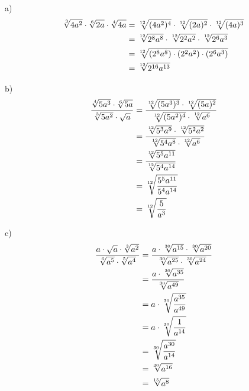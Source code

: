 \begin{solucio}
a)%
\begin{align*}
\sqrt[3]{4a^{2}}\cdot \sqrt[6]{2a}\cdot \sqrt[4]{4a} &=\sqrt[12]{%
(4a^{2})^{4}}\cdot \sqrt[12]{(2a)^{2}}\cdot \sqrt[12]{(4a)^{3}} \\
&=\sqrt[12]{2^{8}a^{8}}\cdot \sqrt[12]{2^{2}a^{2}}\cdot \sqrt[12]{2^{6}a^{3}%
} \\
&=\sqrt[12]{\left( 2^{8}a^{8}\right) \cdot \left( 2^{2}a^{2}\right) \cdot
\left( 2^{6}a^{3}\right) } \\
&=\sqrt[12]{2^{16}a^{13}}
\end{align*}

b)%
\begin{align*}
\frac{\sqrt[4]{5a^{3}}\cdot \sqrt[6]{5a}}{\sqrt[3]{5a^{2}}\cdot \sqrt{a}} &=%
\frac{\sqrt[12]{(5a^{3})^{3}}\cdot \sqrt[12]{(5a)^{2}}}{\sqrt[12]{%
(5a^{2})^{4}}\cdot \sqrt[12]{a^{6}}} \\
&=\frac{\sqrt[12]{5^{3}a^{9}}\cdot \sqrt[12]{5^{2}a^{2}}}{\sqrt[12]{%
5^{4}a^{8}}\cdot \sqrt[12]{a^{6}}} \\
&=\frac{\sqrt[12]{5^{5}a^{11}}}{\sqrt[12]{5^{4}a^{14}}} \\
&=\sqrt[12]{\frac{5^{5}a^{11}}{5^{4}a^{14}}} \\
&=\sqrt[12]{\frac{5}{a^{3}}}
\end{align*}

c)%
\begin{align*}
\frac{a\cdot \sqrt{a}\cdot \sqrt[3]{a^{2}}}{\sqrt[6]{a^{5}}\cdot \sqrt[5]{%
a^{4}}} &=\frac{a\cdot \sqrt[30]{a^{15}}\cdot \sqrt[30]{a^{20}}}{\sqrt[30]{%
a^{25}}\cdot \sqrt[30]{a^{24}}} \\
&=\frac{a\cdot \sqrt[30]{a^{35}}}{\sqrt[30]{a^{49}}} \\
&=a\cdot \sqrt[30]{\frac{a^{35}}{a^{49}}} \\
&=a\cdot \sqrt[30]{\frac{1}{a^{14}}} \\
&=\sqrt[30]{\frac{a^{30}}{a^{14}}} \\
&=\sqrt[30]{a^{16}} \\
&=\sqrt[15]{a^{8}}
\end{align*}


\end{solucio}
